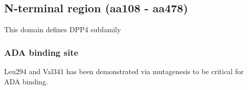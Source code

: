 \subsection{N-terminal region (aa108 - aa478)}

This domain defines DPP4 subfamily

\subsubsection{ADA binding site}
Leu294 and Val341 has been demonstrated via mutagenesis to be critical for ADA binding.~\cite{Abbott_1999}